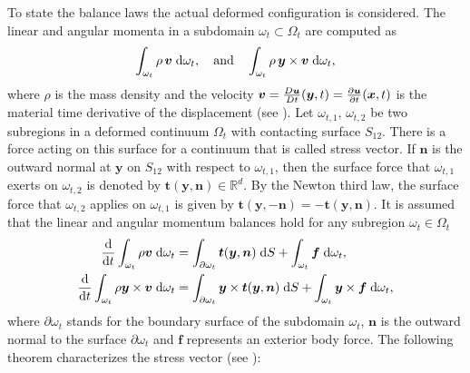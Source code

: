 To state the balance laws the actual deformed configuration is considered. The linear and angular momenta in a subdomain $\omega_t \subset \Omega_t$ are computed as 
\begin{equation*}
\int_{\omega_t} \rho \, \bm{v} \d{\omega_t}, \quad\text{and}\quad \int_{\omega_t} \rho \, \bm{y} \times \bm{v} \d{\omega_t},
\end{equation*}
where $\rho$ is the mass density and the velocity $\bm{v} = \frac{D\bm{u}}{Dt}(\bm{y},t) = \diffp{\bm{u}}{t}(\bm{x},t)$ is the material time derivative of the displacement (see \cite[Chapter 1]{abeyaratne2012notes}).  Let $\omega_{t, 1},\, \omega_{t, 2}$ be two subregions in a deformed continuum $\Omega_t$ with contacting surface $S_{12}$. There is a force acting on this surface for a continuum that is called stress vector. If $\bm{n}$ is the outward normal at $\bm{y}$ on $S_{12}$ with respect to $\omega_{t, 1}$, then the surface force that $\omega_{t, 1}$ exerts on $\omega_{t, 2}$ is denoted by $\bm{t}(\bm{y}, \bm{n}) \in \mathbb{R}^d$. By the Newton third law, the surface force that $\omega_{t, 2}$ applies on $\omega_{t, 1}$ is given by $\bm{t}(\bm{y}, -\bm{n}) = - \bm{t}(\bm{y}, \bm{n})$. It is assumed that the linear and angular momentum balances hold for any subregion $\omega_t \in \Omega_t$ 
\begin{align*}
	\diff{}{t} \int_{\omega_t} \rho \bm{v} \d{\omega_t} &= \int_{\partial \omega_t} \bm{t}(\bm{y}, \bm{n}) \d{S} + \int_{\omega_t} \bm{f} \d{\omega_t}, \\
	\diff{}{t} \int_{\omega_t} \rho\bm{y} \times \bm{v} \d{\omega_t} &= \int_{\partial \omega_t} \bm{y} \times \bm{t}(\bm{y}, \bm{n}) \d{S} + \int_{\omega_t} \bm{y} \times \bm{f} \d{\omega_t}, \\
\end{align*}
where $\partial \omega_t$ stands for the boundary surface of the subdomain $\omega_t$, $\bm{n}$ is the outward normal to the surface $\partial\omega_t$ and $\bm{f}$ represents an exterior body force. The following theorem characterizes the stress vector (see \cite[Chapter 2]{ciarlet1988mathematical}):

